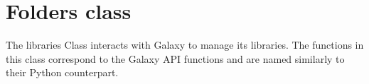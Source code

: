 \hypertarget{group__libraries__class}{}\section{Folders class}
\label{group__libraries__class}
The libraries Class interacts with Galaxy to manage its libraries. The functions in this class correspond to the Galaxy A\+PI functions and are named similarly to their Python counterpart. 